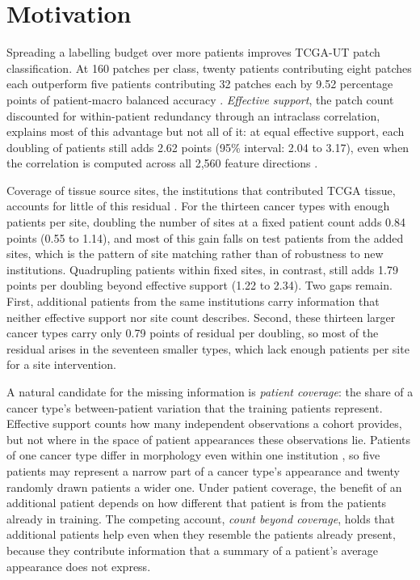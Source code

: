 \documentclass[11pt]{article}
\begin{document}
\section{Motivation}
\label{sec:motivation}
Spreading a labelling budget over more patients improves TCGA-UT patch classification. At 160 patches per class, twenty patients contributing eight patches each outperform five patients contributing 32 patches each by 9.52 percentage points of patient-macro balanced accuracy \citep{queisler2026effectiveSupport}. \emph{Effective support}, the patch count discounted for within-patient redundancy through an intraclass correlation, explains most of this advantage but not all of it: at equal effective support, each doubling of patients still adds 2.62 points (95\% interval: 2.04 to 3.17), even when the correlation is computed across all 2,560 feature directions \citep{queisler2026multidirectionalRedundancy}.

Coverage of tissue source sites, the institutions that contributed TCGA tissue, accounts for little of this residual \citep{queisler2026siteCoverage}. For the thirteen cancer types with enough patients per site, doubling the number of sites at a fixed patient count adds 0.84 points (0.55 to 1.14), and most of this gain falls on test patients from the added sites, which is the pattern of site matching rather than of robustness to new institutions. Quadrupling patients within fixed sites, in contrast, still adds 1.79 points per doubling beyond effective support (1.22 to 2.34). Two gaps remain. First, additional patients from the same institutions carry information that neither effective support nor site count describes. Second, these thirteen larger cancer types carry only 0.79 points of residual per doubling, so most of the residual arises in the seventeen smaller types, which lack enough patients per site for a site intervention.

A natural candidate for the missing information is \emph{patient coverage}: the share of a cancer type's between-patient variation that the training patients represent. Effective support counts how many independent observations a cohort provides, but not where in the space of patient appearances these observations lie. Patients of one cancer type differ in morphology even within one institution \citep{komura2022universalEncoding}, so five patients may represent a narrow part of a cancer type's appearance and twenty randomly drawn patients a wider one. Under patient coverage, the benefit of an additional patient depends on how different that patient is from the patients already in training. The competing account, \emph{count beyond coverage}, holds that additional patients help even when they resemble the patients already present, because they contribute information that a summary of a patient's average appearance does not express.
\end{document}
